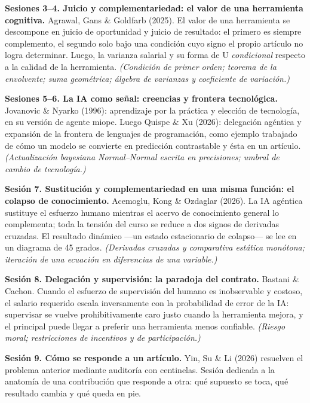 \documentclass[11pt]{article}
\begin{document}
\textbf{Sesiones 3--4. Juicio y complementariedad: el valor de una herramienta cognitiva.}
Agrawal, Gans \& Goldfarb (2025). El valor de una herramienta se descompone en juicio de oportunidad y juicio de resultado: el primero es siempre complemento, el segundo solo bajo una condici\'on cuyo signo el propio art\'iculo no logra determinar. Luego, la varianza salarial y su forma de U \emph{condicional} respecto a la calidad de la herramienta.
\emph{(Condici\'on de primer orden; teorema de la envolvente; suma geom\'etrica; \'algebra de varianzas y coeficiente de variaci\'on.)}

\textbf{Sesiones 5--6. La IA como se\~nal: creencias y frontera tecnol\'ogica.}
Jovanovic \& Nyarko (1996): aprendizaje por la pr\'actica y elecci\'on de tecnolog\'ia, en su versi\'on de agente miope. Luego Quispe \& Xu (2026): delegaci\'on ag\'entica y expansi\'on de la frontera de lenguajes de programaci\'on, como ejemplo trabajado de c\'omo un modelo se convierte en predicci\'on contrastable y \'esta en un art\'iculo.
\emph{(Actualizaci\'on bayesiana Normal--Normal escrita en precisiones; umbral de cambio de tecnolog\'ia.)}

\textbf{Sesi\'on 7. Sustituci\'on y complementariedad en una misma funci\'on: el colapso de conocimiento.}
Acemoglu, Kong \& Ozdaglar (2026). La IA ag\'entica sustituye el esfuerzo humano mientras el acervo de conocimiento general lo complementa; toda la tensi\'on del curso se reduce a dos signos de derivadas cruzadas. El resultado din\'amico ---un estado estacionario de colapso--- se lee en un diagrama de 45 grados.
\emph{(Derivadas cruzadas y comparativa est\'atica mon\'otona; iteraci\'on de una ecuaci\'on en diferencias de una variable.)}

\textbf{Sesi\'on 8. Delegaci\'on y supervisi\'on: la paradoja del contrato.}
Bastani \& Cachon. Cuando el esfuerzo de supervisi\'on del humano es inobservable y costoso, el salario requerido escala inversamente con la probabilidad de error de la IA: supervisar se vuelve prohibitivamente caro justo cuando la herramienta mejora, y el principal puede llegar a preferir una herramienta menos confiable.
\emph{(Riesgo moral; restricciones de incentivos y de participaci\'on.)}

\textbf{Sesi\'on 9. C\'omo se responde a un art\'iculo.}
Yin, Su \& Li (2026) resuelven el problema anterior mediante auditor\'ia con centinelas. Sesi\'on dedicada a la anatom\'ia de una contribuci\'on que responde a otra: qu\'e supuesto se toca, qu\'e resultado cambia y qu\'e queda en pie.
\end{document}
